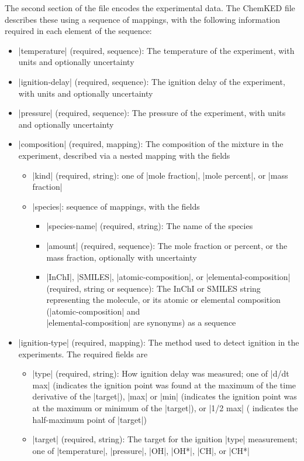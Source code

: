 \documentclass[12pt]{ijck}
\newcommand\ck{ChemKED}
\begin{document}
The second section of the file encodes the experimental data. The \ck{} file
describes these using a sequence of mappings, with the following information required
in each element of the sequence:
%
\begin{itemize}
    \item \yabox|temperature| (required, sequence): The temperature of the
    experiment, with units and optionally uncertainty
    \item \yabox|ignition-delay| (required, sequence): The ignition delay of the
    experiment, with units and optionally uncertainty
    \item \yabox|pressure| (required, sequence): The pressure of the experiment,
    with units and optionally uncertainty
    \item \yabox|composition| (required, mapping): The composition of the
    mixture in the experiment, described via a nested mapping with the fields
    \begin{itemize}
        \item \yabox|kind| (required, string): one of \yabox|mole fraction|, \yabox|mole percent|, or \yabox|mass fraction|
        \item \yabox|species|: sequence of mappings, with the fields
        \begin{itemize}
            \item \yabox|species-name| (required, string): The name of the species
            \item \yabox|amount| (required, sequence): The mole fraction or percent, or the mass fraction, optionally with uncertainty
            \item \yabox|InChI|, \yabox|SMILES|, \yabox|atomic-composition|, or
            \yabox|elemental-composition| (required, string or sequence): The InChI
            or SMILES string representing the molecule, or its atomic or elemental
            composition (\yabox|atomic-composition| and\\
            \yabox|elemental-composition| are synonyms) as a sequence
        \end{itemize}
    \end{itemize}
    \item \yabox|ignition-type| (required, mapping): The method used to detect
    ignition in the experiments. The required fields are
    \begin{itemize}
        \item \yabox|type| (required, string): How ignition delay was
        measured; one of \yabox|d/dt max| (indicates the ignition point was
        found at the maximum of the time derivative of the \yabox|target|),
        \yabox|max| or \yabox|min| (indicates the ignition point was at the
        maximum or minimum of the \yabox|target|), or \yabox|1/2 max| (
        indicates the half-maximum point of \yabox|target|)
        \item \yabox|target| (required, string): The target for the ignition
        \yabox|type| measurement; one of \yabox|temperature|, \yabox|pressure|,
        \yabox|OH|, \yabox|OH*|, \yabox|CH|, or \yabox|CH*|
    \end{itemize}
\end{itemize}
\end{document}
